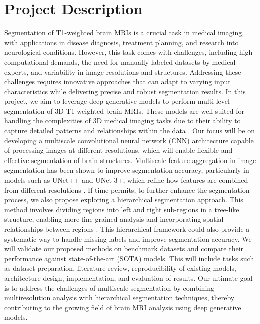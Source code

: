 \documentclass[12pt]{report}
\begin{document}
\section*{Project Description}
Segmentation of T1-weighted brain MRIs is a crucial task in medical imaging, with applications in disease diagnosis, treatment planning, and research into neurological conditions. However, this task comes with challenges, including high computational demands, the need for manually labeled datasets by medical experts, and variability in image resolutions and structures. Addressing these challenges requires innovative approaches that can adapt to varying input characteristics while delivering precise and robust segmentation results.
\newline
\newline
In this project, we aim to leverage deep generative models to perform multi-level segmentation of 3D T1-weighted brain MRIs. These models are well-suited for handling the complexities of 3D medical imaging tasks due to their ability to capture detailed patterns and relationships within the data \cite{wu2023medsegdiff}. Our focus will be on developing a multiscale convolutional neural network (CNN) architecture capable of processing images at different resolutions, which will enable flexible and effective segmentation of brain structures. Multiscale feature aggregation in image segmentation has been shown to improve segmentation accuracy, particularly in models such as UNet++ and UNet 3+, which refine how features are combined from different resolutions \cite{zhou2020unet++,huang2021unet3+}.
\newline
\newline
If time permits, to further enhance the segmentation process, we also propose exploring a hierarchical segmentation approach. This method involves dividing regions into left and right sub-regions in a tree-like structure, enabling more fine-grained analysis and incorporating spatial relationships between regions \cite{ghazi2022fastaid}. This hierarchical framework could also provide a systematic way to handle missing labels and improve segmentation accuracy.
\newline
\newline
We will validate our proposed methods on benchmark datasets and compare their performance against state-of-the-art (SOTA) models. This will include tasks such as dataset preparation, literature review, reproducibility of existing models, architecture design, implementation, and evaluation of results.
\newline
\newline
Our ultimate goal is to address the challenges of multiscale segmentation by combining multiresolution analysis with hierarchical segmentation techniques, thereby contributing to the growing field of brain MRI analysis using deep generative models.
\end{document}
